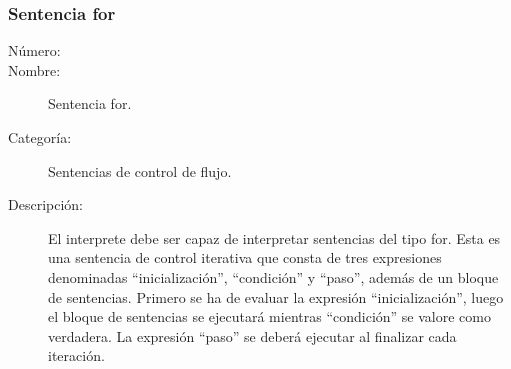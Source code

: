 \subsubsection{Sentencia for}
\begin{framed}
	\begin{description}
		\item [Número:] \cn
		\item [Nombre:] Sentencia for.
		\item [Categoría:] Sentencias de control de flujo.
		\item [Descripción:] El interprete debe ser capaz de interpretar sentencias del tipo for. Esta es una sentencia de control
		iterativa que consta de tres expresiones denominadas ``inicialización'', ``condición'' y ``paso'', además de un bloque de sentencias.
		Primero se ha de evaluar la expresión ``inicialización'', luego el bloque de sentencias se ejecutará mientras ``condición'' se
		valore como verdadera. La expresión ``paso'' se deberá ejecutar al finalizar cada iteración.   %
	\end {description}
\end{framed}


